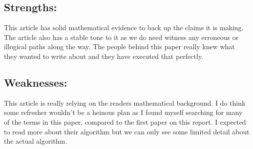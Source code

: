 \documentclass{article}
\begin{document}
\subsection*{Strengths:} 

\begin{adjustwidth}{1cm}{}
	This article has solid mathematical evidence to back up the claims it is making. The article also has a stable tone to it as we do need witness any erroneous or illogical paths along the way. The people behind this paper really knew what they wanted to write about and they have executed that perfectly. 
\end{adjustwidth}

\subsection*{Weaknesses:} 

\begin{adjustwidth}{1cm}{}
		This article is really relying on the readers mathematical background. I do think some refresher wouldn't be a heinous plan as I found myself searching for many of the terms in this paper, compared to the first paper on this report. I expected to read more about their algorithm but we can only see some limited detail about the actual algorithm.
\end{adjustwidth}
\end{document}
